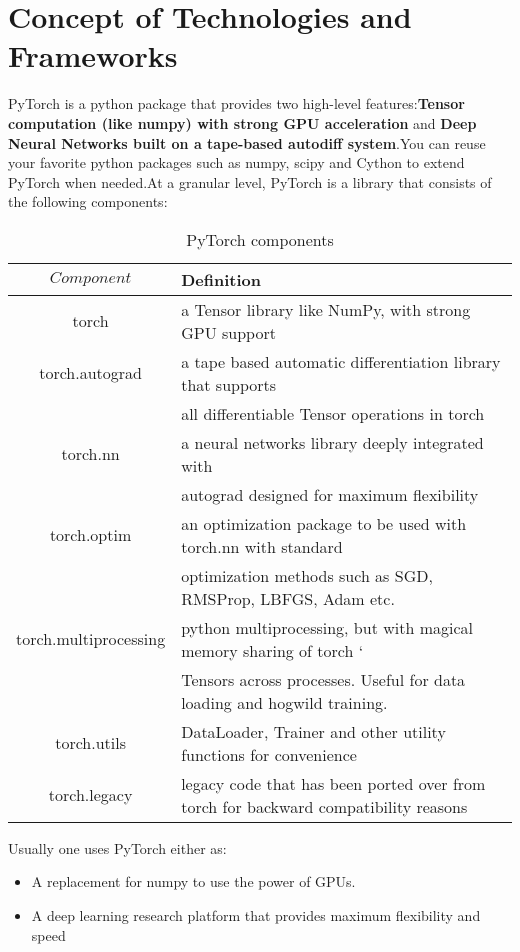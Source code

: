 \section{Concept of Technologies and Frameworks}\label{sec:4.4}
\par PyTorch is a python package that provides two high-level features:\textbf{Tensor computation (like numpy) with strong GPU acceleration} and \textbf{Deep Neural Networks built on a tape-based autodiff system}.You can reuse your favorite python packages such as numpy, scipy and Cython to extend PyTorch when needed.At a granular level, PyTorch is a library that consists of the following components:
\begin{table}[tbp]
	\centering
	\caption{PyTorch components}
	\label{tab:sample11}
	\begin{tabular}{cl}
		\toprule
		$Component$ 			& Definition 																			\\ \midrule
		torch  					& a Tensor library like NumPy, with strong GPU support 									\\
		torch.autograd 			& a tape based automatic differentiation library that supports 							\\ 
								& all differentiable Tensor operations in torch 										\\
		torch.nn  				& a neural networks library deeply integrated with 					 					\\
								& autograd designed for maximum  flexibility 											\\
		torch.optim  			& an optimization package to be used with torch.nn with standard 						\\  
								& optimization  methods such as SGD, RMSProp, LBFGS, Adam etc.							\\
		torch.multiprocessing 	& python multiprocessing, but with magical memory sharing of torch  		`			\\ 
								& Tensors across processes. Useful for data loading and hogwild training. 				\\
		torch.utils  			& DataLoader, Trainer and other utility functions for convenience 						\\
		torch.legacy  			& legacy code that has been ported over from torch for backward compatibility reasons 	\\
		\bottomrule
	\end{tabular}
\end{table}

\noindent Usually one uses PyTorch either as:
\begin{itemize}
	\item A replacement for numpy to use the power of GPUs.
	\item A deep learning research platform that provides maximum flexibility and speed
\end{itemize}

